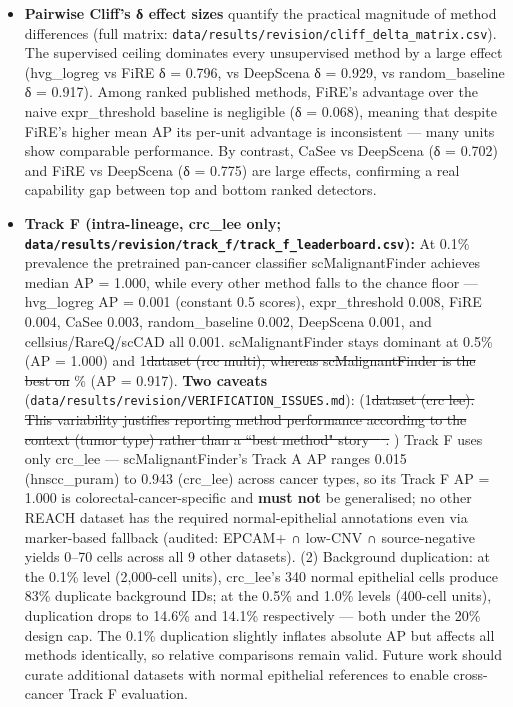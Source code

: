 \documentclass[10pt]{article}
\providecommand{\DIFaddtex}[1]{{\protect\color{trackgreen}#1}} %
\providecommand{\DIFdeltex}[1]{{\protect\color{red}\sout{#1}}}                      %
\providecommand{\DIFaddbegin}{} %
\providecommand{\DIFaddend}{} %
\providecommand{\DIFdelbegin}{} %
\providecommand{\DIFdelend}{} %
\providecommand{\DIFadd}[1]{\texorpdfstring{\DIFaddtex{#1}}{#1}} %
\providecommand{\DIFdel}[1]{\texorpdfstring{\DIFdeltex{#1}}{}} %
\newcommand{\DIFscaledelfig}{0.5}
\newlength{\DIFdelgraphicswidth} %
\newlength{\DIFdelgraphicsheight} %
\newcommand{\DIFaddincludegraphics}[2][]{{\color{trackgreen}\fbox{\DIFOincludegraphics[#1]{#2}}}} %
\newcommand{\DIFdelincludegraphics}[2][]{%
\sbox{\DIFdelgraphicsbox}{\DIFOincludegraphics[#1]{#2}}%
\settoboxwidth{\DIFdelgraphicswidth}{\DIFdelgraphicsbox} %
\settoboxtotalheight{\DIFdelgraphicsheight}{\DIFdelgraphicsbox} %
\scalebox{\DIFscaledelfig}{%
\parbox[b]{\DIFdelgraphicswidth}{\usebox{\DIFdelgraphicsbox}\\[-\baselineskip] \rule{\DIFdelgraphicswidth}{0em}}\llap{\resizebox{\DIFdelgraphicswidth}{\DIFdelgraphicsheight}{%
\setlength{\unitlength}{\DIFdelgraphicswidth}%
\begin{picture}(1,1)%
\thicklines\linethickness{2pt} %
{\color[rgb]{1,0,0}\put(0,0){\framebox(1,1){}}}%
{\color[rgb]{1,0,0}\put(0,0){\line( 1,1){1}}}%
{\color[rgb]{1,0,0}\put(0,1){\line(1,-1){1}}}%
\end{picture}%
}\hspace*{3pt}}} %
} %
\DeclareRobustCommand{\DIFaddbegin}{\DIFOaddbegin \let\includegraphics\DIFaddincludegraphics} %
\DeclareRobustCommand{\DIFaddend}{\DIFOaddend \let\includegraphics\DIFOincludegraphics} %
\DeclareRobustCommand{\DIFdelbegin}{\DIFOdelbegin \let\includegraphics\DIFdelincludegraphics} %
\DeclareRobustCommand{\DIFdelend}{\DIFOaddend \let\includegraphics\DIFOincludegraphics} %
\begin{document}
\begin{itemize}
{  its Track A performance. Track C thus functions as a specificity
  diagnostic: a method that cannot keep its null FPR near 3\% is unfit
  for deployment in low-prevalence screening.
}\item
  \textbf{\DIFadd{Pairwise Cliff's δ effect sizes}} \DIFadd{quantify the practical
  magnitude of method differences (full matrix:
  }\texttt{\DIFadd{data/results/revision/cliff\_delta\_matrix.csv}}\DIFadd{). The
  supervised ceiling dominates every unsupervised method by a large
  effect (hvg\_logreg vs FiRE δ = 0.796, vs DeepScena δ = 0.929, vs
  random\_baseline δ = 0.917). Among ranked published methods, FiRE's
  advantage over the naive expr\_threshold baseline is negligible (δ =
  0.068), meaning that despite FiRE's higher mean AP its per-unit
  advantage is inconsistent --- many units show comparable performance.
  By contrast, CaSee vs DeepScena (δ = 0.702) and FiRE vs DeepScena (δ =
  0.775) are large effects, confirming a real capability gap between top
  and bottom ranked detectors.
}\item
  \textbf{\DIFadd{Track F (intra-lineage, crc\_lee only;
  }\texttt{\DIFadd{data/results/revision/track\_f/track\_f\_leaderboard.csv}}\DIFadd{):}}
  \DIFadd{At 0.1\% prevalence the pretrained pan-cancer classifier
  scMalignantFinder achieves median AP = 1.000, while every other method
  falls to the chance floor --- hvg\_logreg AP = 0.001 (constant 0.5
  scores), expr\_threshold 0.008, FiRE 0.004, CaSee 0.003,
  random\_baseline 0.002, DeepScena 0.001, and cellsius/RareQ/scCAD all
  0.001. scMalignantFinder stays dominant at 0.5\% (AP = 1.000) and }\DIFaddend 1\DIFdelbegin \DIFdel{dataset (rcc multi), whereas scMalignantFinder is the best on }\DIFdelend \DIFaddbegin \DIFadd{\%
  (AP = 0.917). }\textbf{\DIFadd{Two caveats}}
  \DIFadd{(}\texttt{\DIFadd{data/results/revision/VERIFICATION\_ISSUES.md}}\DIFadd{): (}\DIFaddend 1\DIFdelbegin \DIFdel{dataset (crc lee). This variability justifies reporting method performance according to the context (tumor type) rather than a ``best method" story \mbox{%
\cite{peng2019single,qian2020pan,tirosh2024cancer}}\hskip0pt%
.
}\DIFdelend \DIFaddbegin \DIFadd{) Track F
  uses only crc\_lee --- scMalignantFinder's Track A AP ranges 0.015
  (hnscc\_puram) to 0.943 (crc\_lee) across cancer types, so its Track F
  AP = 1.000 is colorectal-cancer-specific and }\textbf{\DIFadd{must not}} \DIFadd{be
  generalised; no other REACH dataset has the required normal-epithelial
  annotations even via marker-based fallback (audited: EPCAM+ ∩ low-CNV
  ∩ source-negative yields 0--70 cells across all 9 other datasets). (2)
  Background duplication: at the 0.1\% level (2,000-cell units),
  crc\_lee's 340 normal epithelial cells produce 83\% duplicate
  background IDs; at the 0.5\% and 1.0\% levels (400-cell units),
  duplication drops to 14.6\% and 14.1\% respectively --- both under the
  20\% design cap. The 0.1\% duplication slightly inflates absolute AP
  but affects all methods identically, so relative comparisons remain
  valid. Future work should curate additional datasets with normal
  epithelial references to enable cross-cancer Track F evaluation.
}\end{itemize}
\DIFaddend 
\end{document}
